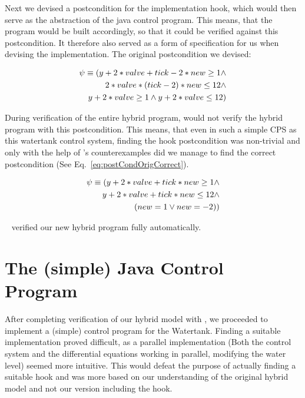 Next we devised a postcondition for the implementation hook, which would then serve as the abstraction of the java control program. This means, that the program would be built accordingly, so that it could be verified against this postcondition. It therefore also served as a form of specification for us when devising the implementation. The original postcondition we devised:

\begin{equation}
	\centering
	\begin{split}
		\psi \equiv (y + 2* valve + tick -2 * new  \geq 1 \wedge \\ 2 * valve * (tick - 2) * new \leq 12 \wedge \\  y + 2* valve \geq 1 \wedge  y + 2 * valve \leq 12) 
	\end{split}
\label{eq:postCondOrig}
\end{equation}

During verification of the entire hybrid program, \keym would not verify the hybrid program with this postcondition. This means, that even in such a simple CPS as this watertank control system, finding the hook postcondition was non-trivial and only with the help of \keym's counterexamples did we manage to find the correct postcondition (See Eq.~\ref{eq:postCondOrigCorrect}). 

\begin{equation}
	\centering
	\begin{split}
		\psi \equiv (y + 2 * valve + tick * new \geq 1 \wedge\\ y + 2 * valve + tick * new \leq 12 \wedge \\(new = 1  \vee new = -2))
	\end{split}
	\label{eq:postCondOrigCorrect}
\end{equation}

\keym~ verified our new hybrid program fully automatically.

\section{The (simple) Java Control Program}
\label{sec:Watertank:Java}

After completing verification of our hybrid model with \keym, we proceeded to implement a (simple) control program for the Watertank. Finding a suitable implementation proved difficult, as a parallel implementation (Both the control system and the differential equations working in parallel, modifying the water level) seemed more intuitive. This would defeat the purpose of actually finding a suitable hook and was more based on our understanding of the original hybrid model and not our version including the hook.

